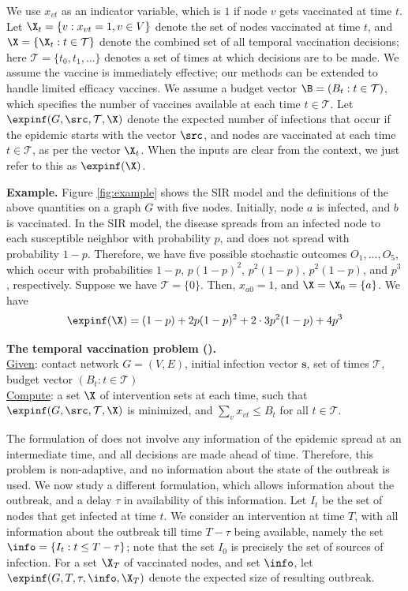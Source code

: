 We use $x_{vt}$ as an indicator variable, which is $1$ if node $v$ gets vaccinated at time $t$.
Let $\X_t=\{v: x_{vt}=1, v\in V\}$ denote the set of nodes vaccinated at time $t$, and 
$\X=\{\X_t: t\in\mathcal{T}\}$ denote the combined set of all temporal vaccination
decisions; here $\mathcal{T}=\{t_0, t_1,\ldots\}$ denotes a set of times at which decisions are to be made.
We assume the vaccine is immediately effective; our methods can be extended to handle limited efficacy vaccines.
We assume a budget vector $\B=(B_t: t\in\mathcal{T})$, which specifies the number of vaccines available
at each time $t\in\mathcal{T}$.
Let $\expinf(G, \src, \mathcal{T}, \X)$ denote the expected number of infections that occur if the epidemic
starts with the vector $\src$, and nodes are vaccinated at each time $t\in\mathcal{T}$, as per the vector $\X_t$.
When the inputs are clear from the context, we just refer to this as $\expinf(\X)$.

\noindent
\textbf{Example.} Figure \ref{fig:example} shows the SIR model and the definitions of the above quantities
on a graph $G$ with five nodes. Initially, node $a$ is infected, and $b$ is vaccinated. 
In the SIR model, the disease spreads from an infected node to each susceptible neighbor with probability $p$,
and does not spread with probability $1-p$. Therefore, we have five possible stochastic outcomes $O_1,\ldots,O_5$,
which occur with probabilities $1-p$, $p(1-p)^2$, $p^2(1-p)$, $p^2(1-p)$, and $p^3$, respectively.
Suppose we have $\mathcal{T}=\{0\}$. Then, $x_{a0}=1$, and $\X=\X_0=\{a\}$.
We have 
\[
\expinf(\X)= (1-p) +2p(1-p)^2+2\cdot 3 p^2(1-p) + 4p^3
\]

\noindent
\textbf{The temporal vaccination problem (\prob).}\\
\underline{Given}: contact network $G=(V, E)$, initial infection vector $\mathbf{s}$, set of times $\mathcal{T}$,
budget vector $(B_t: t\in\mathcal{T})$\\
\underline{Compute}: a set $\X$ of intervention sets at each time, 
such that $\expinf(G, \src, \mathcal{T}, \X)$ is minimized, and $\sum_v x_{vt} \leq B_t$ for all $t\in\mathcal{T}$.


The formulation of \prob{} does not involve any information of the epidemic spread at an intermediate
time, and all decisions are made ahead of time. Therefore, this problem is non-adaptive, and no information
about the state of the outbreak is used. We now study a different formulation, which allows information about
the outbreak, and a delay $\tau$ in availability of this information. Let $I_t$ be the set of nodes that
get infected at time $t$.
We consider an intervention at time $T$, with all information about the outbreak till time $T-\tau$ being available,
namely the set $\info=\{I_t: t\leq T-\tau\}$; note that the set $I_0$ is precisely the set of sources of infection.
For a set $\X_T$ of vaccinated nodes, and set $\info$, let $\expinf(G, T, \tau, \info, \X_T)$ denote the expected size of
resulting outbreak. 

